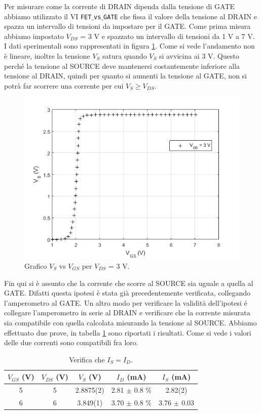 \documentclass[journal, a4paper]{IEEEtran}
\begin{document}
Per misurare come la corrente di DRAIN dipenda dalla tensione di GATE abbiamo utilizzato il VI \texttt{FET$\_$vs$\_$GATE} che fissa il valore della tensione al DRAIN e spazza un intervallo di tensioni da impostare per il GATE. Come prima misura abbiamo impostato $V_{DS}$ = 3 V e spazzato un intervallo di tensioni da 1 V a 7 V. I dati sperimentali sono rappresentati in figura \ref{fig:es4_3}. Come si vede l'andamento non è lineare, inoltre la tensione $V_S$ satura quando $V_S$ si avvicina ai 3 V. Questo perché la tensione al SOURCE deve mantenersi costantemente inferiore alla tensione al DRAIN, quindi per quanto si aumenti la tensione al GATE, non si potrà far scorrere una corrente per cui $V_S \geq V_{DS}$. 

\begin{figure}[htp]
\centering
\includegraphics[scale=.5]{es4_3}
\caption{Grafico $V_S$ vs $V_{GS}$ per $V_{DS}$ = 3 V.}
\label{fig:es4_3}
\end{figure}

Fin qui si è assunto che la corrente che scorre al SOURCE sia uguale a quella al GATE. Difatti questa ipotesi è stata già precedentemente verificata, collegando l'amperometro al GATE. Un altro modo per verificare la validità dell'ipotesi é collegare l'amperometro in serie al DRAIN e verificare che la corrente misurata sia compatibile con quella calcolata misurando la tensione al SOURCE. Abbiamo effettuato due prove, in tabella \ref{tab:es6} sono riportati i risultati. Come si vede i valori delle due correnti sono compatibili fra loro.

\begin{table}[htp]
\centering
\caption{Verifica che $I_S = I_D$.}
\label{tab:es6}
\begin{tabular}{|c|c|c|c|c|}
\hline 
$V_{GS}$ (V)& $V_{DS}$ (V) & $V_S$ (V) & $I_D$ (mA)& $I_S$ (mA) \\ 
\hline 
5 & 5 & 2.8875(2) & 2.81 $\pm$ 0.8 $\%$ & 2.82(2) \\ 
\hline 
6 & 6 & 3.849(1) & 3.70 $\pm$ 0.8 $\%$ & 3.76 $\pm$ 0.03 \\ 
\hline 
\end{tabular} 
\end{table}
\end{document}
